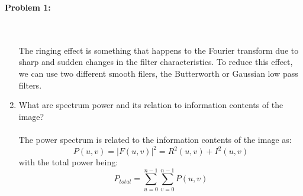 \documentclass[11pt]{article}
\newenvironment{problem}[1]{\textbf{Problem #1: }}{\newpage}
\begin{document}
\begin{problem}{1}
\begin{enumerate}[label = (\alph*)]
			\\ \\
			The ringing effect is something that happens to the Fourier transform due to sharp and sudden changes in the filter characteristics.  To reduce this effect, we can use two different smooth filers, the Butterworth or Gaussian low pass filters. 
			\\
			\item What are spectrum power and its relation to information contents of the image?
			\\ \\
			The power spectrum is related to the information contents of the image as:
			\[P(u,v) = |F(u,v)|^2 = R^2(u,v) + I^2(u,v)\]
			with the total power being:
			\[P_{total} = \sum_{u = 0}^{n - 1} \sum_{v = 0}^{n-1} P(u,v)\]
		\end{enumerate}	
	\end{problem}
\end{document}
